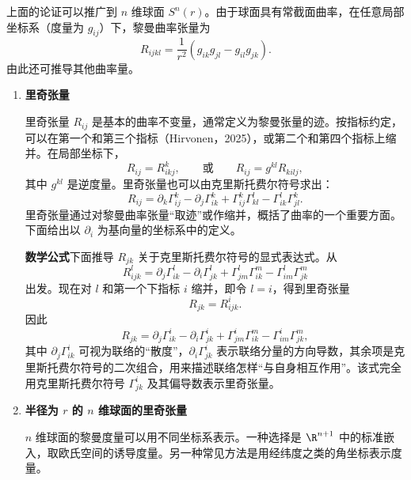 \begin{enumerate}
  上面的论证可以推广到 $n$ 维球面 $S^n(r)$。由于球面具有常截面曲率，在任意局部坐标系（度量为 $g_{ij}$）下，黎曼曲率张量为
  \[
    R_{ijkl}=\frac1{r^2}(g_{ik}g_{jl}-g_{il}g_{jk}).
  \]
  由此还可推导其他曲率量。
  \begin{enumerate}[label=\alph*.]
    \item \textbf{里奇张量}

    里奇张量 $R_{ij}$ 是基本的曲率不变量，通常定义为黎曼张量的迹。按指标约定，可以在第一个和第三个指标（Hirvonen，2025），或第二个和第四个指标上缩并。在局部坐标下，
    \begin{equation*}
      R_{ij}=R^k_{ikj},\qquad\text{或}\qquad R_{ij}=g^{kl}R_{kilj},
      \tag{5B31}\label{eq:5B31}
    \end{equation*}
    其中 $g^{kl}$ 是逆度量。里奇张量也可以由克里斯托费尔符号求出：
    \begin{equation*}
      R_{ij}=\partial_k\Gamma^k_{ij}-\partial_j\Gamma^k_{ik}
             +\Gamma^k_{ij}\Gamma^l_{kl}-\Gamma^l_{ik}\Gamma^k_{jl}.
      \tag{5B32}\label{eq:5B32}
    \end{equation*}
    里奇张量通过对黎曼曲率张量“取迹”或作缩并，概括了曲率的一个重要方面。下面给出以 $\partial_i$ 为基向量的坐标系中的定义。

    \textbf{数学公式}\quad 下面推导 $R_{jk}$ 关于克里斯托费尔符号的显式表达式。从
    \[
      R^l_{ijk}=\partial_j\Gamma^l_{ik}-\partial_i\Gamma^l_{jk}
        +\Gamma^l_{jm}\Gamma^m_{ik}-\Gamma^l_{im}\Gamma^m_{jk}
    \]
    出发。现在对 $l$ 和第一个下指标 $i$ 缩并，即令 $l=i$，得到里奇张量
    \[
      R_{jk}=R^i_{ijk}.
    \]
    因此
    \begin{equation*}
      R_{jk}=\partial_j\Gamma^i_{ik}-\partial_i\Gamma^i_{jk}
        +\Gamma^i_{jm}\Gamma^m_{ik}-\Gamma^i_{im}\Gamma^m_{jk},
      \tag{5B33}\label{eq:5B33}
    \end{equation*}
    其中 $\partial_j\Gamma^i_{ik}$ 可视为联络的“散度”，$\partial_i\Gamma^i_{jk}$ 表示联络分量的方向导数，其余项是克里斯托费尔符号的二次组合，用来描述联络怎样“与自身相互作用”。该式完全用克里斯托费尔符号 $\Gamma^i_{jk}$ 及其偏导数表示里奇张量。

    \item \textbf{半径为 $r$ 的 $n$ 维球面的里奇张量}

    $n$ 维球面的黎曼度量可以用不同坐标系表示。一种选择是 $\R^{n+1}$ 中的标准嵌入，取欧氏空间的诱导度量。另一种常见方法是用经纬度之类的角坐标表示度量。


\end{enumerate}
\end{enumerate}

